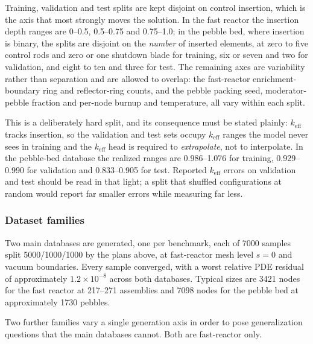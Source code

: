 \documentclass[preprint,12pt]{elsarticle}
\newcommand{\keff}{k_{\mathrm{eff}}}
\begin{document}
Training, validation and test splits are kept disjoint on control insertion,
which is the axis that most strongly moves the solution. In the fast reactor the
insertion depth ranges are 0--0.5, 0.5--0.75 and 0.75--1.0; in the pebble bed,
where insertion is binary, the splits are disjoint on the \emph{number} of
inserted elements, at zero to five control rods and zero or one shutdown blade
for training, six or seven and two for validation, and eight to ten and three
for test. The remaining axes are variability rather than separation and are
allowed to overlap: the fast-reactor enrichment-boundary ring and reflector-ring
counts, and the pebble packing seed, moderator-pebble fraction and per-node
burnup and temperature, all vary within each split.

This is a deliberately hard split, and its consequence must be stated plainly:
$\keff$ tracks insertion, so the validation and test sets occupy $\keff$ ranges
the model never sees in training and the $\keff$ head is required to
\emph{extrapolate}, not to interpolate. In the pebble-bed database the realized
ranges are 0.986--1.076 for training, 0.929--0.990 for validation and
0.833--0.905 for test. Reported $\keff$ errors on validation and test should be
read in that light; a split that shuffled configurations at random would report
far smaller errors while measuring far less.

\subsubsection{Dataset families}
\label{sec:datafamilies}

Two main databases are generated, one per benchmark, each of 7000 samples split
5000/1000/1000 by the plans above, at fast-reactor mesh level $s=0$ and vacuum
boundaries. Every sample converged, with a worst relative PDE residual of
approximately $1.2\times10^{-8}$ across both databases. Typical sizes are 3421
nodes for the fast reactor at 217--271 assemblies and 7098 nodes for the pebble
bed at approximately 1730 pebbles.

Two further families vary a single generation axis in order to pose
generalization questions that the main databases cannot. Both are fast-reactor
only.
\end{document}
